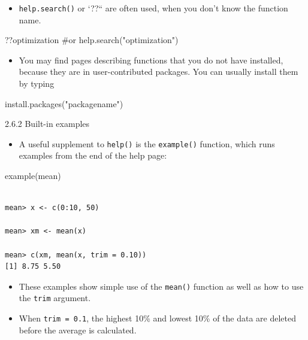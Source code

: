 \documentclass[
  9pt,
  a4paper,
  ignorenonframetext,
  notheorems]{beamer}
\newenvironment{Shaded}{\begin{snugshade}}{\end{snugshade}}
\newcommand{\CommentTok}[1]{\textcolor[rgb]{0.37,0.37,0.37}{#1}}
\newcommand{\FunctionTok}[1]{\textcolor[rgb]{0.28,0.35,0.67}{#1}}
\newcommand{\NormalTok}[1]{\textcolor[rgb]{0.00,0.23,0.31}{#1}}
\newcommand{\StringTok}[1]{\textcolor[rgb]{0.13,0.47,0.30}{#1}}
\providecommand{\tightlist}{%
  \setlength{\itemsep}{0pt}\setlength{\parskip}{0pt}}\usepackage{longtable,booktabs,array}
\begin{document}
\begin{frame}[fragile]
\begin{itemize}
\tightlist
\item
  \texttt{help.search()} or `??{}`` are often used, when you don't know
  the function name.
\end{itemize}

\begin{Shaded}
\begin{Highlighting}[]
\NormalTok{??optimization}
\CommentTok{\#or}
\FunctionTok{help.search}\NormalTok{(}\StringTok{"optimization"}\NormalTok{)}
\end{Highlighting}
\end{Shaded}

\begin{itemize}
\tightlist
\item
  You may find pages describing functions that you do not have
  installed, because they are in user-contributed packages. You can
  usually install them by typing
\end{itemize}

\begin{Shaded}
\begin{Highlighting}[]
\FunctionTok{install.packages}\NormalTok{(}\StringTok{"packagename"}\NormalTok{)}
\end{Highlighting}
\end{Shaded}
\end{frame}

\begin{frame}[fragile]{2.6.2 Built-in examples}
\protect\hypertarget{built-in-examples}{}
\begin{itemize}
\tightlist
\item
  A useful supplement to \texttt{help()} is the \texttt{example()}
  function, which runs examples from the end of the help page:
\end{itemize}

\begin{Shaded}
\begin{Highlighting}[]
\FunctionTok{example}\NormalTok{(mean)}
\end{Highlighting}
\end{Shaded}

\begin{verbatim}

mean> x <- c(0:10, 50)

mean> xm <- mean(x)

mean> c(xm, mean(x, trim = 0.10))
[1] 8.75 5.50
\end{verbatim}

\begin{itemize}
\item
  These examples show simple use of the \texttt{mean()} function as well
  as how to use the \texttt{trim} argument.
\item
  When \texttt{trim\ =\ 0.1}, the highest 10\% and lowest 10\% of the
  data are deleted before the average is calculated.
\end{itemize}
\end{frame}
\end{document}
